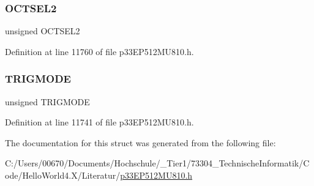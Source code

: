\subsubsection{\texorpdfstring{O\+C\+T\+S\+E\+L2}{OCTSEL2}}
{\footnotesize\ttfamily unsigned O\+C\+T\+S\+E\+L2}



Definition at line 11760 of file p33\+E\+P512\+M\+U810.\+h.

\mbox{\label{structtag_o_c10_c_o_n1_b_i_t_s_a7a0057e0dca6e2663584b5b9e1da04c3}} 
\subsubsection{\texorpdfstring{T\+R\+I\+G\+M\+O\+DE}{TRIGMODE}}
{\footnotesize\ttfamily unsigned T\+R\+I\+G\+M\+O\+DE}



Definition at line 11741 of file p33\+E\+P512\+M\+U810.\+h.



The documentation for this struct was generated from the following file\+:\begin{DoxyCompactItemize}
\item 
C\+:/\+Users/00670/\+Documents/\+Hochschule/\+\_\+\+Tier1/73304\+\_\+\+Technische\+Informatik/\+Code/\+Hello\+World4.\+X/\+Literatur/\hyperlink{p33_e_p512_m_u810_8h}{p33\+E\+P512\+M\+U810.\+h}\end{DoxyCompactItemize}
